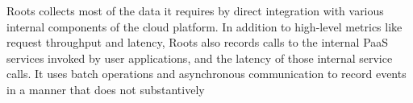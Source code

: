 %
Roots collects most of the data it requires by direct integration with various internal components 
of the cloud platform. In addition to high-level metrics like request throughput
and latency, Roots also records calls to the internal PaaS services invoked by user applications,
and the latency of those internal service calls. It uses batch operations and asynchronous 
communication to record events in a manner that does not substantively
